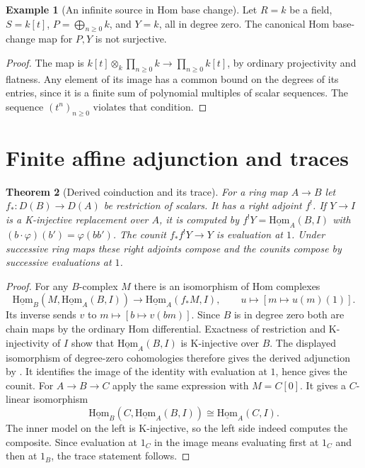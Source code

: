 \documentclass[11pt,oneside,openany]{book}
\newtheorem{theorem}{Theorem}[chapter]
\theoremstyle{definition}
\newtheorem{example}[theorem]{Example}
\theoremstyle{remark}
\begin{document}
\begin{example}[An infinite source in Hom base change]\label{res:U13}
Let \(R=k\) be a field, \(S=k[t]\), \(P=\bigoplus_{n\geq0}k\),
and \(Y=k\), all in degree zero. The canonical Hom base-change
map for \(P,Y\) is not surjective.
\end{example}
\begin{proof}
The map is \(k[t]\otimes_k\prod_{n\geq0}k\to\prod_{n\geq0}k[t]\),
by ordinary projectivity and flatness. Any element of its image
has a common bound on the degrees of its entries, since it is a
finite sum of polynomial multiples of scalar sequences.
The sequence \((t^n)_{n\geq0}\) violates that condition.
\end{proof}

\section{Finite affine adjunction and traces}

\begin{theorem}[Derived coinduction and its trace]\label{res:U14}
For a ring map \(A\to B\) let \(f_*:D(B)\to D(A)\) be
restriction of scalars. It has a right adjoint \(f^!\).
If \(Y\to I\) is a K-injective replacement over \(A\), it is computed
by \(f^!Y=\underline{\mathrm{Hom}}_A(B,I)\) with
\((b\cdot\varphi)(b')=\varphi(bb')\).
The counit \(f_*f^!Y\to Y\) is evaluation at \(1\).
Under successive ring maps these right adjoints compose and
the counits compose by successive evaluations at \(1\).
\end{theorem}
\begin{proof}
For any \(B\)-complex \(M\) there is an isomorphism of Hom complexes
\[
 \underline{\mathrm{Hom}}_B
  (M,\underline{\mathrm{Hom}}_A(B,I))
 \longrightarrow \underline{\mathrm{Hom}}_A(f_*M,I),
 \qquad u\longmapsto [m\mapsto u(m)(1)].
\]
Its inverse sends \(v\) to \(m\mapsto[b\mapsto v(bm)]\).
Since \(B\) is in degree zero both are chain maps by the ordinary
Hom differential. Exactness of restriction and K-injectivity
of \(I\) show that \(\underline{\mathrm{Hom}}_A(B,I)\)
is K-injective over \(B\). The displayed isomorphism of degree-zero
cohomologies therefore gives the derived adjunction by
\cite[R04]{ha-core}. It identifies the image of the identity
with evaluation at \(1\), hence gives the counit.
For \(A\to B\to C\) apply the same expression with \(M=C[0]\).
It gives a \(C\)-linear isomorphism
\[
 \underline{\mathrm{Hom}}_B(C,\underline{\mathrm{Hom}}_A(B,I))
 \cong\underline{\mathrm{Hom}}_A(C,I).
\]
The inner model on the left is K-injective, so the left side indeed
computes the composite. Since evaluation at \(1_C\) in the
image means evaluating first at \(1_C\) and then at \(1_B\),
the trace statement follows.
\end{proof}
\end{document}

